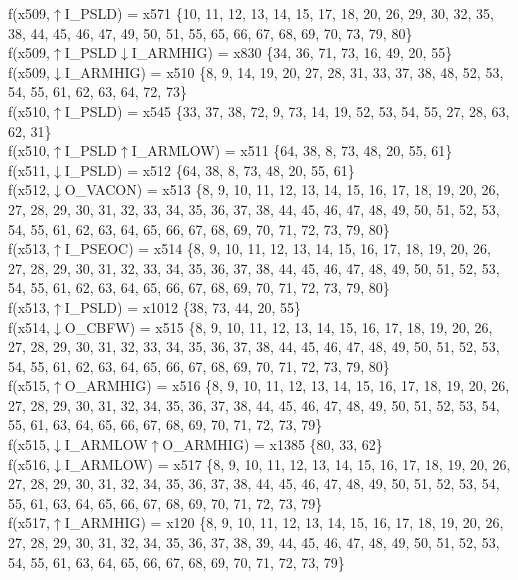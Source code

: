 f(x509,$\uparrow$I\_PSLD) = x571 \{10, 11, 12, 13, 14, 15, 17, 18, 20, 26, 29, 30, 32, 35, 38, 44, 45, 46, 47, 49, 50, 51, 55, 65, 66, 67, 68, 69, 70, 73, 79, 80\} \\  
f(x509,$\uparrow$I\_PSLD$\downarrow$I\_ARMHIG) = x830 \{34, 36, 71, 73, 16, 49, 20, 55\} \\  
f(x509,$\downarrow$I\_ARMHIG) = x510 \{8, 9, 14, 19, 20, 27, 28, 31, 33, 37, 38, 48, 52, 53, 54, 55, 61, 62, 63, 64, 72, 73\} \\  
f(x510,$\uparrow$I\_PSLD) = x545 \{33, 37, 38, 72, 9, 73, 14, 19, 52, 53, 54, 55, 27, 28, 63, 62, 31\} \\  
f(x510,$\uparrow$I\_PSLD$\uparrow$I\_ARMLOW) = x511 \{64, 38, 8, 73, 48, 20, 55, 61\} \\  
f(x511,$\downarrow$I\_PSLD) = x512 \{64, 38, 8, 73, 48, 20, 55, 61\} \\  
f(x512,$\downarrow$O\_VACON) = x513 \{8, 9, 10, 11, 12, 13, 14, 15, 16, 17, 18, 19, 20, 26, 27, 28, 29, 30, 31, 32, 33, 34, 35, 36, 37, 38, 44, 45, 46, 47, 48, 49, 50, 51, 52, 53, 54, 55, 61, 62, 63, 64, 65, 66, 67, 68, 69, 70, 71, 72, 73, 79, 80\} \\  
f(x513,$\uparrow$I\_PSEOC) = x514 \{8, 9, 10, 11, 12, 13, 14, 15, 16, 17, 18, 19, 20, 26, 27, 28, 29, 30, 31, 32, 33, 34, 35, 36, 37, 38, 44, 45, 46, 47, 48, 49, 50, 51, 52, 53, 54, 55, 61, 62, 63, 64, 65, 66, 67, 68, 69, 70, 71, 72, 73, 79, 80\} \\  
f(x513,$\uparrow$I\_PSLD) = x1012 \{38, 73, 44, 20, 55\} \\  
f(x514,$\downarrow$O\_CBFW) = x515 \{8, 9, 10, 11, 12, 13, 14, 15, 16, 17, 18, 19, 20, 26, 27, 28, 29, 30, 31, 32, 33, 34, 35, 36, 37, 38, 44, 45, 46, 47, 48, 49, 50, 51, 52, 53, 54, 55, 61, 62, 63, 64, 65, 66, 67, 68, 69, 70, 71, 72, 73, 79, 80\} \\  
f(x515,$\uparrow$O\_ARMHIG) = x516 \{8, 9, 10, 11, 12, 13, 14, 15, 16, 17, 18, 19, 20, 26, 27, 28, 29, 30, 31, 32, 34, 35, 36, 37, 38, 44, 45, 46, 47, 48, 49, 50, 51, 52, 53, 54, 55, 61, 63, 64, 65, 66, 67, 68, 69, 70, 71, 72, 73, 79\} \\  
f(x515,$\downarrow$I\_ARMLOW$\uparrow$O\_ARMHIG) = x1385 \{80, 33, 62\} \\  
f(x516,$\downarrow$I\_ARMLOW) = x517 \{8, 9, 10, 11, 12, 13, 14, 15, 16, 17, 18, 19, 20, 26, 27, 28, 29, 30, 31, 32, 34, 35, 36, 37, 38, 44, 45, 46, 47, 48, 49, 50, 51, 52, 53, 54, 55, 61, 63, 64, 65, 66, 67, 68, 69, 70, 71, 72, 73, 79\} \\  
f(x517,$\uparrow$I\_ARMHIG) = x120 \{8, 9, 10, 11, 12, 13, 14, 15, 16, 17, 18, 19, 20, 26, 27, 28, 29, 30, 31, 32, 34, 35, 36, 37, 38, 39, 44, 45, 46, 47, 48, 49, 50, 51, 52, 53, 54, 55, 61, 63, 64, 65, 66, 67, 68, 69, 70, 71, 72, 73, 79\} \\  
